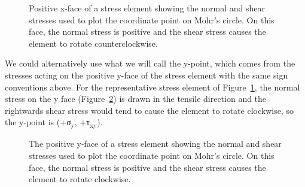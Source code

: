 \documentclass[
  letterpaper,
  DIV=11,
  numbers=noendperiod]{scrreprt}
\theoremstyle{definition}
\theoremstyle{remark}
\begin{document}
\begin{figure}


\caption{\label{fig-12.9}Positive x-face of a stress element showing the
normal and shear stresses used to plot the coordinate point on Mohr's
circle. On this face, the normal stress is positive and the shear stress
causes the element to rotate counterclockwise.}

\end{figure}%

We could alternatively use what we will call the y-point, which comes
from the stresses acting on the positive y-face of the stress element
with the same sign conventions above. For the representative stress
element of Figure~\ref{fig-12.9}, the normal stress on the y face
(Figure~\ref{fig-12.10}) is drawn in the tensile direction and the
rightwards shear stress would tend to cause the element to rotate
clockwise, so the y-point is (+σ\textsubscript{y},
+τ\textsubscript{xy}).

\begin{figure}


\caption{\label{fig-12.10}The positive y-face of a stress element
showing the normal and shear stresses used to plot the coordinate point
on Mohr's circle. On this face, the normal stress is positive and the
shear stress causes the element to rotate clockwise.}

\end{figure}%
\end{document}
